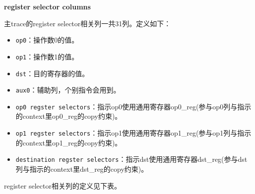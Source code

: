 \begin{table}[!ht]
    \centering {}
    \caption{OlaVM的main trace表opcode value列表}
    \label{table: olavm-trace-table-opcode-value-list}
\end{table}



\textbf{register selector columns}

主trace的register selector相关列一共31列。定义如下：
\begin{itemize}
    \item \verb|op0|：操作数0的值。
    \item \verb|op1|：操作数1的值。
    \item \verb|dst|：目的寄存器的值。
    \item \verb|aux0|：辅助列，个别指令会用到。
    \item \verb|op0 regster selectors|：指示op0使用通用寄存器op0\_reg(参与op0列与指示的context里op0\_reg的copy约束)。
    \item \verb|op1 regster selectors|：指示op1使用通用寄存器op1\_reg(参与op1列与指示的context里op1\_reg的copy约束)。
    \item \verb|destination regster selectors|：指示dst使用通用寄存器dst\_reg(参与dst列与指示的context里dst\_reg的copy约束)。
\end{itemize}

register selector相关列的定义见下表。
\begin{table}[!ht]
    \centering {}
    \caption{OlaVM的main trace表register selector相关列结构}
    \label{table: olavm-trace-table-register-selector}
\end{table}

